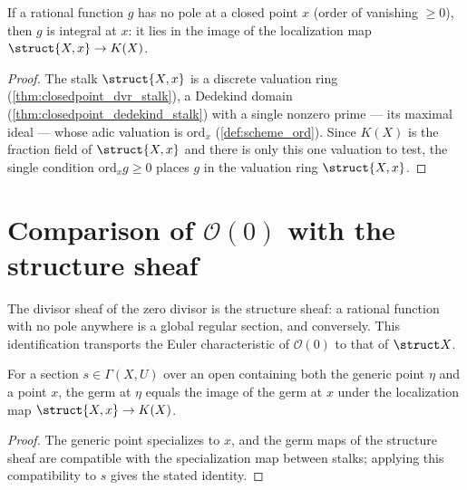 \begin{lemma}
  \label{lem:exists_stalk_of_ord_le_one}
  \leanok
  If a rational function \(g\) has no pole at a closed point \(x\) (order of vanishing \(\ge 0\)),
  then \(g\) is integral at \(x\): it lies in the image of the localization map
  \(\struct{X,x} \to K(X)\).
\end{lemma}
\begin{proof}
  \leanok
  The stalk \(\struct{X,x}\) is a discrete valuation ring (\ref{thm:closedpoint_dvr_stalk}), a
  Dedekind domain (\ref{thm:closedpoint_dedekind_stalk}) with a single nonzero prime --- its
  maximal ideal --- whose adic valuation is \(\mathrm{ord}_x\) (\ref{def:scheme_ord}). Since
  \(K(X)\) is the fraction field of \(\struct{X,x}\) and there is only this one valuation to test,
  the single condition \(\mathrm{ord}_x g \ge 0\) places \(g\) in the valuation ring
  \(\struct{X,x}\).
\end{proof}

\section{Comparison of \(\mathcal O(0)\) with the structure sheaf}

The divisor sheaf of the zero divisor is the structure sheaf: a rational function with no pole
anywhere is a global regular section, and conversely. This identification transports the Euler
characteristic of \(\mathcal O(0)\) to that of \(\struct X\).

\begin{lemma}
  \label{lem:germ_generic_eq_algebraMap_germ}
  \leanok
  For a section \(s \in \Gamma(X, U)\) over an open containing both the generic point \(\eta\) and a
  point \(x\), the germ at \(\eta\) equals the image of the germ at \(x\) under the localization map
  \(\struct{X,x} \to K(X)\).
\end{lemma}
\begin{proof}
  \leanok
  The generic point specializes to \(x\), and the germ maps of the structure sheaf are compatible
  with the specialization map between stalks; applying this compatibility to \(s\) gives the stated
  identity.
\end{proof}

